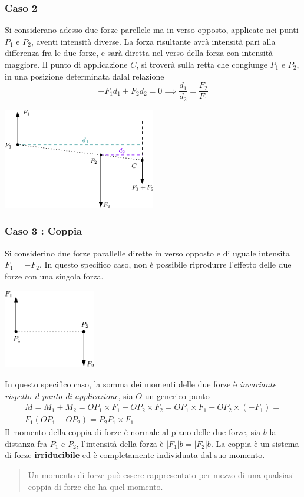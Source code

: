 \documentclass[10pt, letterpaper]{report}
\begin{document}
\subsubsection{Caso 2}
Si considerano adesso due forze parellele ma in verso opposto, applicate nei punti $P_1$ e $P_2$, aventi intensità diverse. La forza risultante avrà intensità pari alla differenza fra le due forze, e sarà diretta nel verso della forza con intensità maggiore.\acc 
Il punto di applicazione $C$, si troverà sulla retta che congiunge $P_1$ e $P_2$, in una 
posizione determinata dalal relazione $$ -F_1d_1+F_2d_2=0\implies \frac{d_1}{d_2}=\frac{F_2}{F_1}$$
\begin{center}
    \includegraphics[width=0.5\textwidth ]{images/forzeEq4.eps}
\end{center}
\subsubsection{Caso 3 : Coppia}
Si considerino due forze parallelle dirette in verso opposto e di uguale intensita $F_1=-F_2$. In questo specifico caso, non è possibile riprodurre l'effetto delle due forze con una singola forza.\begin{center}
    \includegraphics[width=0.3\textwidth ]{images/coppia.eps}
\end{center}
In questo specifico caso, la somma dei momenti delle due forze è \textit{invariante rispetto il punto di applicazione}, sia $O$ un generico punto 
\begin{eqnarray}
    M=M_1+M_2=OP_1\times F_1 + OP_2\times F_2=OP_1\times F_1 + OP_2\times (-F_1)=\\ 
    F_1(OP_1-OP_2)=P_2P_1\times F_1
\end{eqnarray} 
Il momento della coppia di forze è normale al piano delle due forze, sia $b$ la distanza fra $P_1$ e $P_2$, l'intensità della forza è $|F_1|b=|F_2|b$. La coppia è un sistema di forze \textbf{irriducibile} ed è completamente individuata dal suo momento.\begin{quote}
   Un  momento di forze può essere rappresentato per mezzo di una qualsiasi coppia di forze che ha quel momento.
\end{quote}
\flowerLine 
\end{document}
